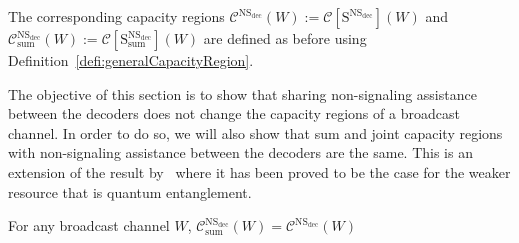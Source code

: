 The corresponding capacity regions $\mathcal{C}^{\mathrm{NS}_{\text{dec}}}(W) := \mathcal{C}[\mathrm{S}^{\mathrm{NS}_{\text{dec}}}](W)$ and $\mathcal{C}^{\mathrm{NS}_{\text{dec}}}_{\text{sum}}(W) := \mathcal{C}[\mathrm{S}_{\text{sum}}^{\mathrm{NS}_{\text{dec}}}](W)$ are defined as before using Definition~\ref{defi:generalCapacityRegion}.


The objective of this section is to show that sharing non-signaling assistance between the decoders does not change the capacity regions of a broadcast channel. In order to do so, we will also show that sum and joint capacity regions with non-signaling assistance between the decoders are the same. This is an extension of the result by~\cite{PDB21} where it has been proved to be the case for the weaker resource that is quantum entanglement.

\begin{proposition}
  \label{prop:NSdecoderssum}
  For any broadcast channel $W$, $\mathcal{C}_{\text{sum}}^{\mathrm{NS}_{\text{dec}}}(W)= \mathcal{C}^{\mathrm{NS}_{\text{dec}}}(W)$
\end{proposition}

